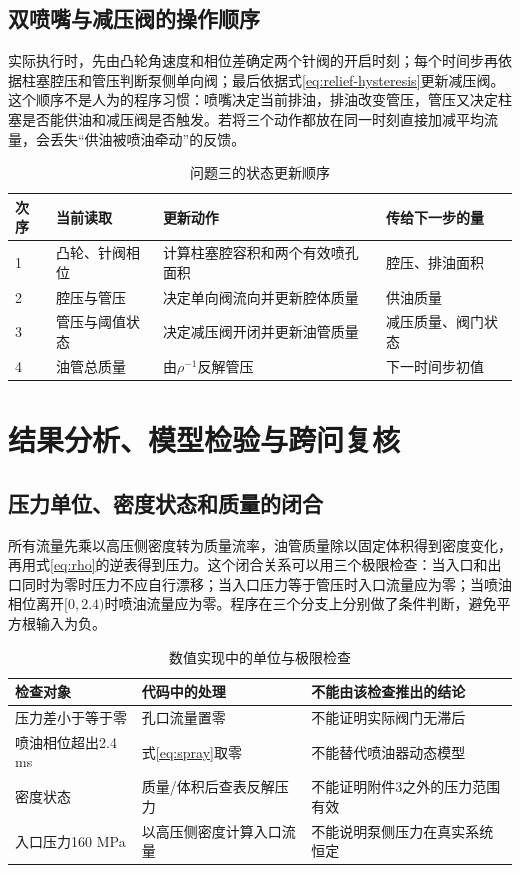 \documentclass[UTF8,11pt,a4paper]{ctexart}
\begin{document}
\subsection{双喷嘴与减压阀的操作顺序}

实际执行时，先由凸轮角速度和相位差确定两个针阀的开启时刻；每个时间步再依据柱塞腔压和管压判断泵侧单向阀；最后依据式\eqref{eq:relief-hysteresis}更新减压阀。这个顺序不是人为的程序习惯：喷嘴决定当前排油，排油改变管压，管压又决定柱塞是否能供油和减压阀是否触发。若将三个动作都放在同一时刻直接加减平均流量，会丢失“供油被喷油牵动”的反馈。

\begin{table}[H]
\centering
\caption{问题三的状态更新顺序}
\label{tab:q3-order}
\small
\begin{tabularx}{\textwidth}{p{1.1cm}p{4.3cm}p{4.2cm}X}
\toprule
次序 & 当前读取 & 更新动作 & 传给下一步的量\\
\midrule
1 & 凸轮、针阀相位 & 计算柱塞腔容积和两个有效喷孔面积 & 腔压、排油面积\\
2 & 腔压与管压 & 决定单向阀流向并更新腔体质量 & 供油质量\\
3 & 管压与阈值状态 & 决定减压阀开闭并更新油管质量 & 减压质量、阀门状态\\
4 & 油管总质量 & 由$\rho^{-1}$反解管压 & 下一时间步初值\\
\bottomrule
\end{tabularx}
\end{table}

\label{mcm-q3-end}

\section{结果分析、模型检验与跨问复核}

\subsection{压力单位、密度状态和质量的闭合}

所有流量先乘以高压侧密度转为质量流率，油管质量除以固定体积得到密度变化，再用式\eqref{eq:rho}的逆表得到压力。这个闭合关系可以用三个极限检查：当入口和出口同时为零时压力不应自行漂移；当入口压力等于管压时入口流量应为零；当喷油相位离开$[0,2.4)$时喷油流量应为零。程序在三个分支上分别做了条件判断，避免平方根输入为负。

\begin{table}[H]
\centering
\caption{数值实现中的单位与极限检查}
\label{tab:unit-check-a}
\small
\begin{tabular}{p{4.3cm}p{4.0cm}p{5.0cm}}
\toprule
检查对象 & 代码中的处理 & 不能由该检查推出的结论\\
\midrule
压力差小于等于零 & 孔口流量置零 & 不能证明实际阀门无滞后\\
喷油相位超出2.4 ms & 式\eqref{eq:spray}取零 & 不能替代喷油器动态模型\\
密度状态 & 质量/体积后查表反解压力 & 不能证明附件3之外的压力范围有效\\
入口压力160 MPa & 以高压侧密度计算入口流量 & 不能说明泵侧压力在真实系统恒定\\
\bottomrule
\end{tabular}
\end{table}
\end{document}
